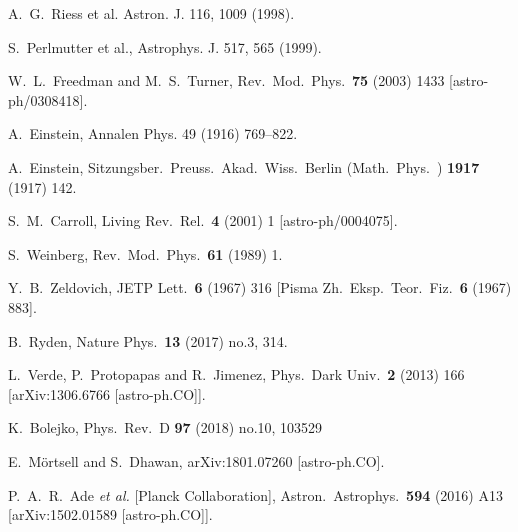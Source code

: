 \documentclass[aps,prd,amsmath,amssymb]{revtex4}
\begin{document}


\begin{thebibliography}{99}
%
 A.~G.~Riess et al. Astron. J. 116, 1009 (1998).

 S.~Perlmutter et al., Astrophys. J. 517, 565 (1999).

 W.~L.~Freedman and M.~S.~Turner,
  Rev.\ Mod.\ Phys.\  {\bf 75} (2003) 1433
[astro-ph/0308418].

 A.~Einstein, 
Annalen Phys. 49 (1916) 769–822.

 A.~Einstein,
  Sitzungsber.\ Preuss.\ Akad.\ Wiss.\ Berlin (Math.\ Phys.\ ) {\bf 1917} (1917) 142.
  
 S.~M.~Carroll,
  Living Rev.\ Rel.\  {\bf 4} (2001) 1
  [astro-ph/0004075].

 S.~Weinberg,
  Rev.\ Mod.\ Phys.\  {\bf 61} (1989) 1.
  
 Y.~B.~Zeldovich,
  JETP Lett.\  {\bf 6} (1967) 316
  [Pisma Zh.\ Eksp.\ Teor.\ Fiz.\  {\bf 6} (1967) 883].


 B.~Ryden,
  Nature Phys.\  {\bf 13} (2017) no.3,  314.

 L.~Verde, P.~Protopapas and R.~Jimenez,
  Phys.\ Dark Univ.\  {\bf 2} (2013) 166
  [arXiv:1306.6766 [astro-ph.CO]].

 K.~Bolejko,
  Phys.\ Rev.\ D {\bf 97} (2018) no.10,  103529

 E.~Mörtsell and S.~Dhawan,
  arXiv:1801.07260 [astro-ph.CO].
  
 P.~A.~R.~Ade {\it et al.} [Planck Collaboration],
  Astron.\ Astrophys.\  {\bf 594} (2016) A13
  [arXiv:1502.01589 [astro-ph.CO]].
  

\end{thebibliography}
\end{document}
